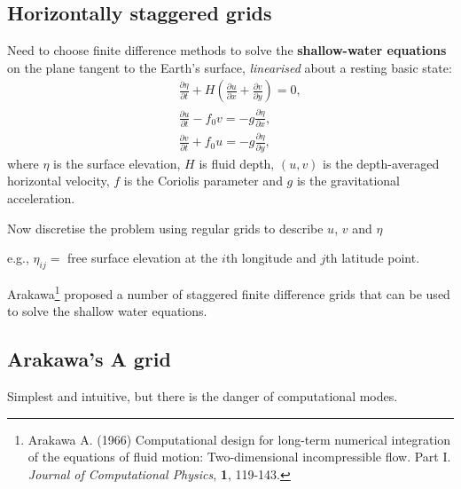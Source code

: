 \subsection{Horizontally staggered grids} 

Need to choose finite difference
methods to solve the {\bf shallow-water equations} on the
plane tangent to the Earth's surface, {\em linearised} about a resting basic state:
\begin{eqnarray}
	&&\frac{\partial \eta}{\partial t} + H \left(
	\frac{\partial u}{\partial x}+\frac{\partial v}{\partial y}\right) = 0, \\
	&&\frac{\partial u}{\partial t} - f_0 v = - g\frac{\partial \eta}{\partial x}, \nonumber\\
	&&\frac{\partial v}{\partial t} + f_0 u = - g\frac{\partial \eta}{\partial y}, \nonumber
\end{eqnarray}
where $\eta$ is the surface elevation, $H$ is fluid depth, $(u,v)$ is
the depth-averaged horizontal velocity, $f$ is the Coriolis parameter
and $g$ is the gravitational acceleration. 

Now discretise the problem using regular grids to describe $u$, $v$ and $\eta$ 

e.g., $\eta_{ij}=$ free surface elevation at the $i$th longitude and $j$th
latitude point.


Arakawa\footnote{Arakawa
	A. (1966) Computational design for long-term numerical integration of
	the equations of fluid motion: Two-dimensional incompressible
	flow. Part I. \emph{Journal of Computational Physics}, \textbf{1},
	119-143.} proposed a number of staggered finite difference
grids that can be used to solve the shallow water equations.  


\subsection{Arakawa's A grid}
Simplest and intuitive, but there is the danger of computational modes.\\

